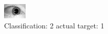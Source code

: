\begin{figure}[h!]
\begin{center}
\includegraphics[width=0.60\columnwidth]{figures/ID1541_class_2_target_1.png}
\end{center}
\caption{ Classification: 2 actual target: 1}
\label{fig:ID1541_class_2_target_1}
\end{figure}

